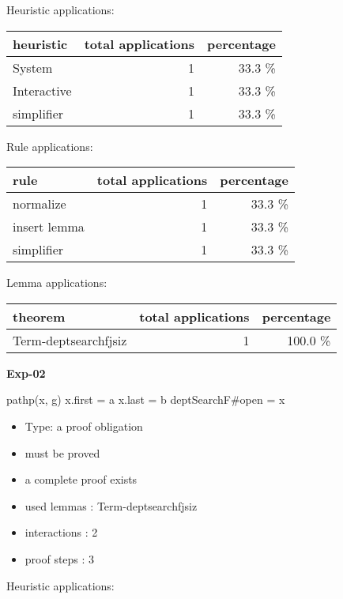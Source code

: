 \documentclass[a4paper]{article}
\begin{document}
Heuristic applications:

\begin{supertabular}{l|r|r}
heuristic	& total applications & percentage \\ \hline
System & 1 & 33.3 \% \\
Interactive & 1 & 33.3 \% \\
simplifier & 1 & 33.3 \% \\

\end{supertabular}

Rule applications:

\begin{supertabular}{l|r|r}
rule	        & total applications & percentage \\ \hline
normalize & 1 & 33.3 \% \\
insert lemma & 1 & 33.3 \% \\
simplifier & 1 & 33.3 \% \\

\end{supertabular}

Lemma applications:

\begin{supertabular}{l|r|r}
theorem	        & total applications & percentage \\ \hline
Term-deptsearchfjsiz & 1 & 100.0 \% \\

\end{supertabular}
\pagebreak

{\LARGE\bf Exp-02}\label{lemma-Exp-02}

\medskip

 \Fol pathp(x, g) \And x.first = a \And x.last = b \Imp \Do deptSearchF\#\Dc open = x

\begin{itemize}

\item Type: a proof obligation

\item       must be proved
\item       a complete proof exists
\item       used lemmas  : Term-deptsearchfjsiz
\item       interactions : 2
\item       proof steps  : 3
\end{itemize}

\medskip


Heuristic applications:
\end{document}
